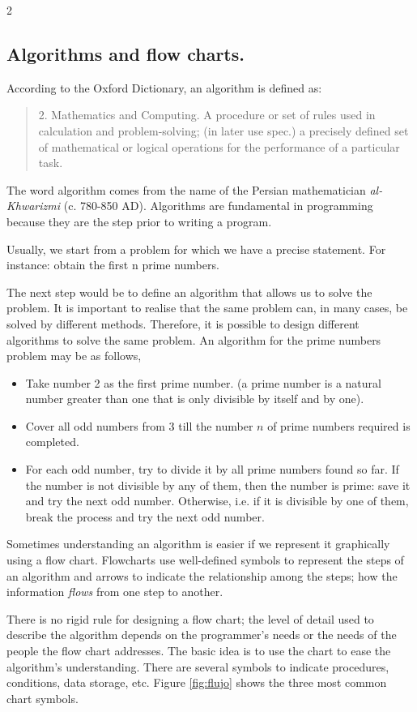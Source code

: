 \begin{paracol}{2}
\subsection{Algorithms and flow charts.}

According to the Oxford Dictionary, an algorithm is defined as:
\begin{quotation}
    2. Mathematics and Computing. A procedure or set of rules used in calculation and problem-solving; (in later use spec.) a precisely defined set of mathematical or logical operations for the performance of a particular task.
\end{quotation}
The word algorithm comes from the name of the Persian mathematician \emph{al-Khwarizmi} (c. 780-850 AD). Algorithms are fundamental in programming because they are the step prior to writing a program. 

 Usually, we start from a problem for which we have a precise statement. For instance: obtain the first n prime numbers.

The next step would be to define an algorithm that allows us to solve the problem. It is important to realise that the same problem can, in many cases, be solved by different methods. Therefore, it is possible to design different algorithms to solve the same problem. An algorithm for the prime numbers problem may be as follows,

\begin{itemize}
    \item Take number 2 as the first prime number. (a prime number is a natural number greater than one that is only divisible by itself and by one).
    \item Cover all odd numbers from 3 till the number $n$ of prime numbers required is completed.
    \item For each odd number, try to divide it by all prime numbers found so far. If the number is not divisible by any of them, then the number is prime: save it and try the next odd number. Otherwise, i.e. if it is divisible by one of them, break the process and try the next odd number.
\end{itemize}

Sometimes understanding an algorithm is easier if we represent it graphically using a flow chart. Flowcharts use well-defined symbols to represent the steps of an algorithm and arrows to indicate the relationship among the steps; how the information \emph{flows} from one step to another.

There is no rigid rule for designing a flow chart; the level of detail used to describe the algorithm depends on the programmer's needs or the needs of the people the flow chart addresses. The basic idea is to use the chart to ease the algorithm's understanding. There are several symbols to indicate procedures, conditions, data storage, etc. Figure \ref{fig:flujo} shows the three most common chart symbols.
\end{paracol}

